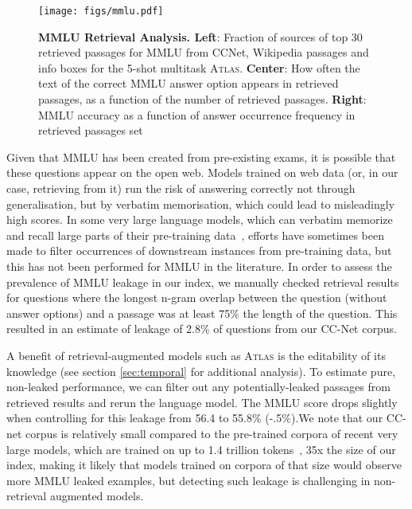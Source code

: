 \documentclass[10pt]{article} \usepackage[preprint]{tmlr}
\newcommand{\Atlas}{\textsc{Atlas}}
\begin{document}
\begin{figure}[t]
\centering
\texttt{[image: figs/mmlu.pdf]}
\caption{\textbf{MMLU Retrieval Analysis. Left}: Fraction of sources of top 30 retrieved passages for MMLU  from CCNet, Wikipedia passages and info boxes for the 5-shot multitask \Atlas{}. \textbf{Center}: How often the text of the correct MMLU answer option appears in retrieved passages, as a function of the number of retrieved passages. \textbf{Right}: MMLU accuracy as a function of answer occurrence frequency in retrieved passages set}
\label{fig:mmlu_retrieval_anslysis}
\end{figure}

Given that MMLU has been created from pre-existing exams, it is possible that these questions appear on the open web.
Models trained on web data (or, in our case, retrieving from it) run the risk of answering correctly not through generalisation, but by verbatim memorisation, which could lead to misleadingly high scores.
In some very large language models, which can verbatim memorize and recall large parts of their pre-training data~\citep{DBLP:conf/uss/CarliniTWJHLRBS21},  efforts have sometimes been made to filter occurrences of downstream instances from pre-training data, but this has not been performed for MMLU in the literature.
In order to assess the prevalence of MMLU leakage in our index, we manually checked retrieval results for questions where the longest n-gram overlap between the question (without answer options) and a passage was at least 75\% the length of the question.
This resulted in an estimate of leakage of 2.8\% of questions from our CC-Net corpus.

A benefit of retrieval-augmented models such as \Atlas{} is the editability of its knowledge (see section \ref{sec:temporal} for additional analysis). 
To estimate pure, non-leaked performance, we can filter out any potentially-leaked passages from retrieved results and rerun the language model.
The MMLU score drops slightly when controlling for this leakage from 56.4 to 55.8\% (-.5\%).We note that our CC-net corpus is relatively small compared to the pre-trained corpora of recent very large models, which are trained on up to 1.4 trillion tokens~\citep{hoffmann2022chinchilla}, 35x the size of our index, making it likely that models trained on corpora of that size would observe more MMLU leaked examples, but detecting such leakage is challenging in non-retrieval augmented models.
\end{document}
